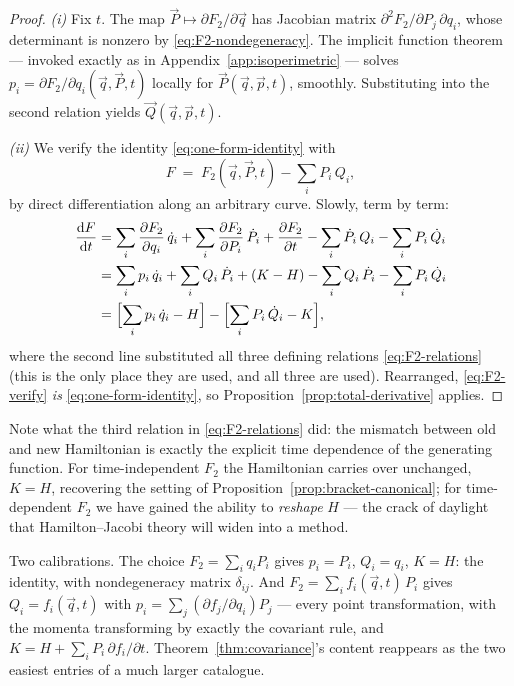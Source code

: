 \documentclass[11pt]{article}
\theoremstyle{plain}
\theoremstyle{definition}
\theoremstyle{remark}
\newcommand{\dd}{\mathrm{d}}
\newcommand{\pd}[2]{\frac{\partial #1}{\partial #2}}
\newcommand{\tot}[2]{\frac{\dd #1}{\dd #2}}
\newcommand{\vq}{\vec{q}}
\newcommand{\vp}{\vec{p}}
\newcommand{\vQ}{\vec{Q}}
\newcommand{\vP}{\vec{P}}
\begin{document}
\begin{proof}
\emph{(i)} Fix $t$. The map $\vP \mapsto \partial F_2/\partial\vq$ has
Jacobian matrix $\partial^2 F_2/\partial P_j\,\partial q_i$, whose
determinant is nonzero by \eqref{eq:F2-nondegeneracy}. The implicit
function theorem --- invoked exactly as in
Appendix~\ref{app:isoperimetric} --- solves
$p_i = \partial F_2/\partial q_i(\vq, \vP, t)$ locally for
$\vP(\vq, \vp, t)$, smoothly. Substituting into the second relation
yields $\vQ(\vq, \vp, t)$.

\emph{(ii)} We verify the identity \eqref{eq:one-form-identity} with
\begin{equation}
  F \;=\; F_2(\vq, \vP, t) - \sum_i P_i\,Q_i ,
\end{equation}
by direct differentiation along an arbitrary curve. Slowly, term by
term:
\begin{align}
  \tot{F}{t}
  &= \sum_i \pd{F_2}{q_i}\,\dot q_i
   + \sum_i \pd{F_2}{P_i}\,\dot P_i
   + \pd{F_2}{t}
   - \sum_i \dot P_i\,Q_i
   - \sum_i P_i\,\dot Q_i \nonumber\\
  &= \sum_i p_i\,\dot q_i
   + \sum_i Q_i\,\dot P_i
   + (K - H)
   - \sum_i Q_i\,\dot P_i
   - \sum_i P_i\,\dot Q_i \nonumber\\
  &= \Bigl[\sum_i p_i\,\dot q_i - H\Bigr]
   - \Bigl[\sum_i P_i\,\dot Q_i - K\Bigr] ,
  \label{eq:F2-verify}
\end{align}
where the second line substituted all three defining relations
\eqref{eq:F2-relations} (this is the only place they are used, and all
three are used). Rearranged, \eqref{eq:F2-verify} \emph{is}
\eqref{eq:one-form-identity}, so
Proposition~\ref{prop:total-derivative} applies.
\end{proof}

Note what the third relation in \eqref{eq:F2-relations} did: the
mismatch between old and new Hamiltonian is exactly the explicit time
dependence of the generating function. For time-independent $F_2$ the
Hamiltonian carries over unchanged, $K = H$, recovering the setting of
Proposition~\ref{prop:bracket-canonical}; for time-dependent $F_2$ we
have gained the ability to \emph{reshape} $H$ --- the crack of daylight
that Hamilton--Jacobi theory will widen into a method.

Two calibrations. The choice $F_2 = \sum_i q_i P_i$ gives $p_i = P_i$,
$Q_i = q_i$, $K = H$: the identity, with nondegeneracy matrix
$\delta_{ij}$. And $F_2 = \sum_i f_i(\vq, t)\,P_i$ gives
$Q_i = f_i(\vq, t)$ with $p_i = \sum_j (\partial f_j/\partial q_i) P_j$
--- every point transformation, with the momenta transforming by
exactly the covariant rule, and $K = H + \sum_i P_i\,
\partial f_i/\partial t$. Theorem~\ref{thm:covariance}'s content
reappears as the two easiest entries of a much larger catalogue.
\end{document}
